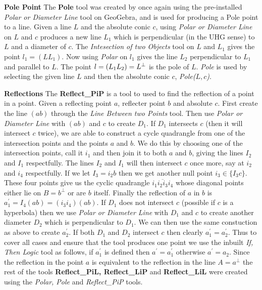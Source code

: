 \documentclass[11pt]{article}
\begin{document}
\textbf{Pole Point}\newline
The \textbf{Pole} tool was created by once again using the pre-installed 
\textit{Polar or Diameter Line} tool on GeoGebra, and is used for producing
a Pole point to a line. Given a line $L$ and the absolute conic $c$, using 
\textit{Polar or Diameter Line} on $L$ and $c$ produces a new line $L_{1}$
which is perpendicular (in the UHG sense) to $L$ and a diameter of $c$. The 
\textit{Intesection of two Objects} tool on $L$ and $L_{1}$ gives the point $%
l_{1}=(LL_{1})$. Now using \textit{Polar} on $l_{1}$ gives the line $L_{2}$
perpendicular to $L_{1}$ and parallel to $L$. The point $l=(L_{1}L_{2})=L^{%
\perp}$ is the pole of $L$.\newline
\textit{Pole} is used by selecting the given line $L$ and then the absolute
conic $c$, \textit{Pole($L,c$)}.\newline

\textbf{Reflections}\newline
The \textbf{Reflect\_PiP} is a tool to used to find the reflection of a
point in a point. Given a reflecting point $a$, reflecter point $b$ and
absolute $c$. First create the line $(ab)$ through the \textit{Line Between
two Points} tool. Then use \textit{Polar or Diameter Line} with $(ab)$ and $%
c $ to create $D_{1}$. If $D_{1}$ intersects $c$ (then it will intersect $c$
twice), we are able to construct a cycle quadrangle from one of the
intersection points and the points $a$ and $b$. We do this by choosing one
of the intersection points, call it $i_{1}$ and then join it to both $a$ and 
$b$, giving the lines $I_{2}$ and $I_{1}$ respectfully. The lines $I_{2}$
and $I_{1}$ will then intersect $c$ once more, say at $i_{2}$ and $i_{4}$
respectfully. If we let $I_{3}=i_{2}b$ then we get another null point $%
i_{3}\in \{I_{3}c\}$. These four points give us the cyclic quadrangle $%
\overline{i_{1}i_{2}i_{3}i_{4}}$ whose diagonal points either lie on $%
B=b^{\perp }$ or are $b$ itself. Finally the reflection of $a$ in $b$ is $%
a_{1}^{\prime }=I_{4}(ab)=(i_{3}i_{4})(ab)$.\newline
If $D_{1}$ does not intersect $c$ (possible if $c$ is a hyperbola) then we
use \textit{Polar or Diameter Line} with $D_{1}$ and $c$ to create another
diameter $D_{2}$ which is perpendicular to $D_{1}$. We can then use the same
constuction as above to create $a_{2}^{\prime }$.\newline
If both $D_{1}$ and $D_{2}$ intersect $c$ then clearly $a_{1}^{\prime
}=a_{2}^{\prime }$. Thus to cover all cases and ensure that the tool
produces one point we use the inbuilt \textit{If, Then Logic} tool as
follows, if $a_{1}^{\prime }$ is defined then $a^{\prime }=a_{1}^{\prime }$
otherwise $a^{\prime }=a_{2}$.\newline
Since the reflection in the point $a$ is equivalent to the reflection in the
line $A=a^{\perp }$ the rest of the tools \textbf{Reflect\_PiL, Reflect\_LiP}
and \textbf{Reflect\_LiL} were created using the \textit{Polar, Pole} and 
\textit{Reflect\_PiP} tools.
\end{document}
